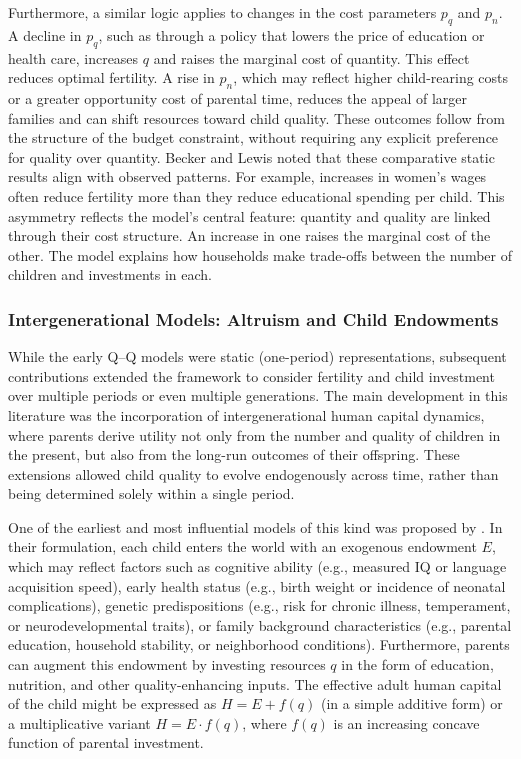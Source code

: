 \documentclass[]{AEA}
\begin{document}
Furthermore, a similar logic applies to changes in the cost parameters
\(p_q\) and \(p_n\). A decline in \(p_q\), such as through a policy that
lowers the price of education or health care, increases \(q\) and raises
the marginal cost of quantity. This effect reduces optimal fertility. A
rise in \(p_n\), which may reflect higher child-rearing costs or a
greater opportunity cost of parental time, reduces the appeal of larger
families and can shift resources toward child quality. These outcomes
follow from the structure of the budget constraint, without requiring
any explicit preference for quality over quantity. Becker and Lewis
noted that these comparative static results align with observed
patterns. For example, increases in women's wages often reduce fertility
more than they reduce educational spending per child. This asymmetry
reflects the model's central feature: quantity and quality are linked
through their cost structure. An increase in one raises the marginal
cost of the other. The model explains how households make trade-offs
between the number of children and investments in each.

\subsubsection{Intergenerational Models: Altruism and Child Endowments}

While the early Q--Q models were static (one-period) representations,
subsequent contributions extended the framework to consider fertility
and child investment over multiple periods or even multiple generations.
The main development in this literature was the incorporation of
intergenerational human capital dynamics, where parents derive utility
not only from the number and quality of children in the present, but
also from the long-run outcomes of their offspring. These extensions
allowed child quality to evolve endogenously across time, rather than
being determined solely within a single period.

One of the earliest and most influential models of this kind was
proposed by \citet{becker1976child}. In their formulation, each child
enters the world with an exogenous endowment \(E\), which may reflect
factors such as cognitive ability (e.g., measured IQ or language
acquisition speed), early health status (e.g., birth weight or incidence
of neonatal complications), genetic predispositions (e.g., risk for
chronic illness, temperament, or neurodevelopmental traits), or family
background characteristics (e.g., parental education, household
stability, or neighborhood conditions). Furthermore, parents can augment
this endowment by investing resources \(q\) in the form of education,
nutrition, and other quality-enhancing inputs. The effective adult human
capital of the child might be expressed as \(H = E + f(q)\) (in a simple
additive form) or a multiplicative variant \(H = E \cdot f(q)\), where
\(f(q)\) is an increasing concave function of parental investment.
\end{document}
